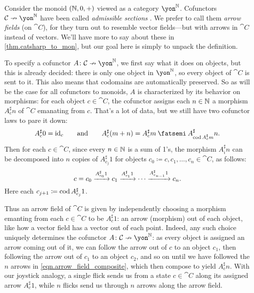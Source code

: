 \documentclass[Book-Poly]{subfiles}
\begin{document}
\begin{example}\label{ex.arrow_field}
Consider the monoid $(\mathbb{N},0,+)$ viewed as a category $\yon^\nn$.
Cofunctors $\cat{C}\cof\yon^\nn$ have been called \emph{admissible sections} \cite{aguiar1997internal}.
We prefer to call them \emph{arrow fields} (on $\cat{C}$), for they turn out to resemble vector fields---but with arrows in $\cat{C}$ instead of vectors.%
We'll have more to say about these in \cref{thm.catsharp_to_mon}, but our goal here is simply to unpack the definition.

To specify a cofunctor $A\colon\cat{C}\cof\yon^\nn$, we first say what it does on objects, but this is already decided: there is only one object in $\yon^\nn$, so every object of $\cat{C}$ is sent to it.
This also means that codomains are automatically preserved.
So as will be the case for all cofunctors to monoids, $A$ is characterized by its behavior on morphisms: for each object $c\in\cat{C}$, the cofunctor assigns each $n\in\mathbb{N}$ a morphism $A^\sharp_c n$ of $\cat{C}$ emanating from $c$.
That's a lot of data, but we still have two cofunctor laws to pare it down:
\[
    A^\sharp_c0=\id_c
        \qqand
    A^\sharp_c(m+n)=A^\sharp_c m\then A^\sharp_{\cod A^\sharp_c m}n.
\]
Then for each $c\in\cat{C}$, since every $n\in\mathbb{N}$ is a sum of 1's, the morphism $A^\sharp_i n$ can be decomposed into $n$ copies of $A^\sharp_{c_j}1$ for objects $c_0\coloneqq c,c_1,\ldots,c_n\in\cat{C}$, as follows:
\begin{equation} \label{eqn.arrow_field_composite}
    c=c_0\xrightarrow{A^\sharp_{c_0}1}c_1\xrightarrow{A^\sharp_{c_1}1}\cdots\xrightarrow{A^\sharp_{c_{n-1}}1}c_n.
\end{equation}
Here each $c_{j+1}\coloneqq\operatorname{cod} A^\sharp_{c_j}1$.

Thus an arrow field of $\cat{C}$ is given by independently choosing a morphism emanting from each $c\in\cat{C}$ to be $A^\sharp_c1$: an arrow (morphism) out of each object, like how a vector field has a vector out of each point.
Indeed, any such choice uniquely determines the cofunctor $A\colon\cat{C}\cof\yon^\nn$: as every object is assigned an arrow coming out of it, we can follow the arrow out of $c$ to an object $c_1$, then following the arrow out of $c_1$ to an object $c_2$, and so on until we have followed the $n$ arrows in \eqref{eqn.arrow_field_composite}, which then compose to yield $A^\sharp_cn$.
With our joystick analogy, a single flick sends us from a state $c\in\cat{C}$ along its assigned arrow $A^\sharp_c1$, while $n$ flicks send us through $n$ arrows along the arrow field.


\end{example}
\end{document}
